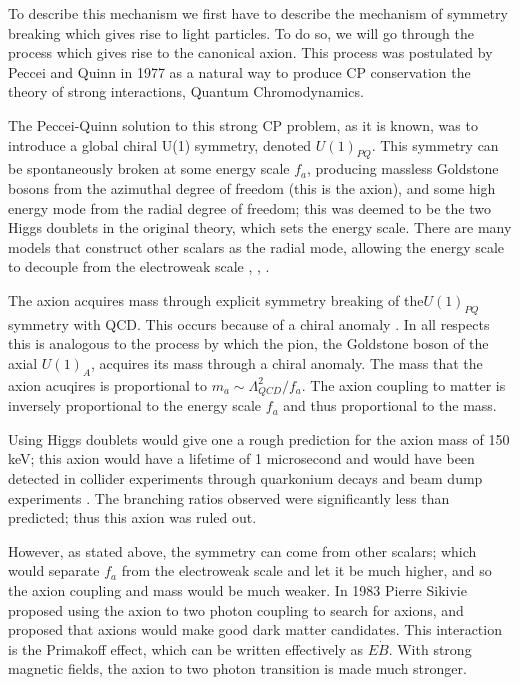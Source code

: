 \documentclass[12pt, twosides]{book}
\begin{document}
To describe this mechanism we first have to describe the mechanism of symmetry breaking which gives rise to light particles. To do so, we will go through the process which gives rise to the canonical axion. This process was postulated by Peccei and Quinn in 1977 \cite{peccei77} as a natural way to produce CP conservation the theory of strong interactions, Quantum Chromodynamics. 

The Peccei-Quinn solution to this strong CP problem, as it is known, was to introduce a global chiral U(1) symmetry, denoted $U(1)_{PQ}$. This symmetry can be spontaneously broken at some energy scale $f_a$, producing massless Goldstone bosons from the azimuthal degree of freedom (this is the axion), and some high energy mode from the radial degree of freedom; this was deemed to be the two Higgs doublets in the original theory, which sets the energy scale.  There are many models that construct other scalars as the radial mode, allowing the energy scale to decouple from the electroweak scale \cite{kim79} \cite{shifman80}, \cite{dine81}, \cite{zhitnitsky80}.

The axion acquires mass through explicit symmetry breaking of the$U(1)_{PQ}$ symmetry with QCD. This occurs because of a chiral anomaly \cite{jackiw76}. In all respects this is analogous to the process by which the pion, the Goldstone boson of the axial $U(1)_A$, acquires its mass through a chiral anomaly. The mass that the axion acuqires is proportional to $m_a \sim \Lambda_{QCD}^2/f_a$. The axion coupling to matter is inversely proportional to the energy scale $f_a$ and thus proportional to the mass.

Using Higgs doublets would give one a rough prediction for the axion mass of 150 keV; this axion would have a lifetime of 1 microsecond and would have been detected in collider experiments through quarkonium decays and beam dump experiments \cite{crystalball90}. The branching ratios observed were significantly less than predicted; thus this axion was ruled out.

However, as stated above, the symmetry can come from other scalars; which would separate $f_a$ from the electroweak scale and let it be much higher, and so the axion coupling and mass would be much weaker. In 1983 Pierre Sikivie proposed using the axion to two photon coupling \cite{sikivie83} to search for axions, and proposed that axions would make good dark matter candidates. This interaction is the Primakoff effect, which can be written effectively as $E \dot B$. With strong magnetic fields, the axion to two photon transition is made much stronger.
\end{document}
